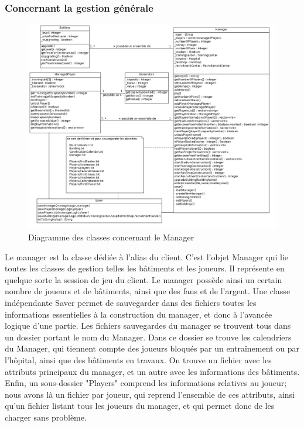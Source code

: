 \documentclass[a4paper,titlepage]{scrreprt}
\begin{document}
  \subsubsection{Concernant la gestion générale}
    \begin{figure}[H]
    \center
    \includegraphics[scale=0.4]{uml/class/ClassManagement.png}
    \caption{Diagramme des classes concernant le Manager}
    \end{figure}	
    Le manager est la classe dédiée à l'alias du client. C'est l'objet Manager qui lie toutes les classes de gestion telles les bâtiments et les joueurs. Il représente en quelque sorte la session de jeu du client. Le manager possède ainsi un certain nombre de joueurs et de bâtiments, ainsi que des fans et de l'argent. Une classe indépendante Saver permet de sauvegarder dans des fichiers toutes les informations essentielles à la construction du manager, et donc à l'avancée logique d'une partie. Les fichiers sauvegardes du manager se trouvent tous dans un dossier portant le nom du Manager. Dans ce dossier se trouve les calendriers du Manager, qui tiennent compte des joueurs bloqués par un entraînement ou par l'hôpital, ainsi que des bâtiments en travaux. On trouve un fichier avec les attributs principaux du manager, et un autre avec les informations des bâtiments. Enfin, un sous-dossier "Players" comprend les informations relatives au joueur; nous avons là un fichier par joueur, qui reprend l'ensemble de ces attributs, ainsi qu'un fichier listant tous les joueurs du manager, et qui permet donc de les charger sans problème.
\end{document}
